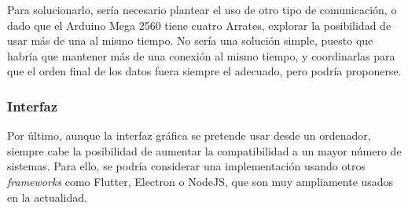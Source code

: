 Para solucionarlo, sería necesario plantear el uso de otro tipo de comunicación, o dado que el Arduino Mega 2560 tiene cuatro Arrates, explorar la posibilidad de usar más de una al mismo tiempo. No sería una solución simple, puesto que habría que mantener más de una conexión al mismo tiempo, y coordinarlas para que el orden final de los datos fuera siempre el adecuado, pero podría proponerse.

\subsubsection{Interfaz}

Por último, aunque la interfaz gráfica se pretende usar desde un ordenador, siempre cabe la posibilidad de aumentar la compatibilidad a un mayor número de sistemas. Para ello, se podría considerar una implementación usando otros \textit{frameworks} como Flutter, Electron o NodeJS, que son muy ampliamente usados en la actualidad.
